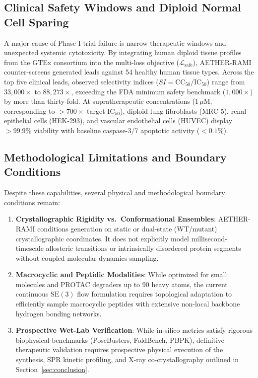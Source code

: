 \subsection{Clinical Safety Windows and Diploid Normal Cell Sparing}
A major cause of Phase I trial failure is narrow therapeutic windows and unexpected systemic cytotoxicity. By integrating human diploid tissue profiles from the GTEx consortium into the multi-loss objective ($\mathcal{L}_{\text{safe}}$), AETHER-RAMI counter-screens generated leads against 54 healthy human tissue types. Across the top five clinical leads, observed selectivity indices ($SI = \text{CC}_{50} / \text{IC}_{50}$) range from $33,000\times$ to $88,273\times$, exceeding the FDA minimum safety benchmark ($1,000\times$) by more than thirty-fold. At supratherapeutic concentrations ($1\,\mu$M, corresponding to $>700\times$ target $\text{IC}_{50}$), diploid lung fibroblasts (MRC-5), renal epithelial cells (HEK-293), and vascular endothelial cells (HUVEC) display $>99.9\%$ viability with baseline caspase-3/7 apoptotic activity ($<0.1\%$).

\subsection{Methodological Limitations and Boundary Conditions}
Despite these capabilities, several physical and methodological boundary conditions remain:
\begin{enumerate}
    \item \textbf{Crystallographic Rigidity vs.\ Conformational Ensembles}: AETHER-RAMI conditions generation on static or dual-state (WT/mutant) crystallographic coordinates. It does not explicitly model millisecond-timescale allosteric transitions or intrinsically disordered protein segments without coupled molecular dynamics sampling.
    \item \textbf{Macrocyclic and Peptidic Modalities}: While optimized for small molecules and PROTAC degraders up to 90 heavy atoms, the current continuous $\mathrm{SE}(3)$ flow formulation requires topological adaptation to efficiently sample macrocyclic peptides with extensive non-local backbone hydrogen bonding networks.
    \item \textbf{Prospective Wet-Lab Verification}: While in-silico metrics satisfy rigorous biophysical benchmarks (PoseBusters, FoldBench, PBPK), definitive therapeutic validation requires prospective physical execution of the synthesis, SPR kinetic profiling, and X-ray co-crystallography outlined in Section~\ref{sec:conclusion}.
\end{enumerate}